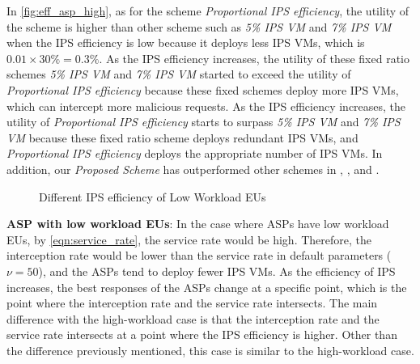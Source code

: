 \documentclass[10pt,journal, compsoc]{IEEEtran}
\begin{document}
In \cref{fig:eff_asp_high}, as for the scheme \textit{Proportional IPS efficiency}, the utility of the scheme is higher than other scheme such as \textit{5\% IPS VM} and \textit{7\% IPS VM} when the IPS efficiency is low because it deploys less IPS VMs, which is $0.01 \times 30\% = 0.3\%$. As the IPS efficiency increases, the utility of these fixed ratio schemes \textit{5\% IPS VM} and \textit{7\% IPS VM} started to exceed the utility of \textit{Proportional IPS efficiency} because these fixed schemes deploy more IPS VMs, which can intercept more malicious requests. As the IPS efficiency increases, the utility of \textit{Proportional IPS efficiency} starts to surpass \textit{5\% IPS VM} and \textit{7\% IPS VM} because these fixed ratio scheme deploys redundant IPS VMs, and \textit{Proportional IPS efficiency} deploys the appropriate number of IPS VMs. In addition, our \textit{Proposed Scheme} has outperformed other schemes in , , and .

\begin{figure}[!]
\captionsetup{justification=centering}
  \hfill
  \hfill
\label{fig:eff_low}
\caption{Different IPS efficiency of Low Workload EUs}
\end{figure}

\textbf{ASP with low workload EUs}: In the case where ASPs have low workload EUs, by \cref{eqn:service_rate}, the service rate would be high. Therefore, the interception rate would be lower than the service rate in default parameters ($\nu = 50$), and the ASPs tend to deploy fewer IPS VMs. As the efficiency of IPS increases, the best responses of the ASPs change at a specific point, which is the point where the interception rate and the service rate intersects. The main difference with the high-workload case is that the interception rate and the service rate intersects at a point where the IPS efficiency is higher. Other than the difference previously mentioned, this case is similar to the high-workload case.
\end{document}
